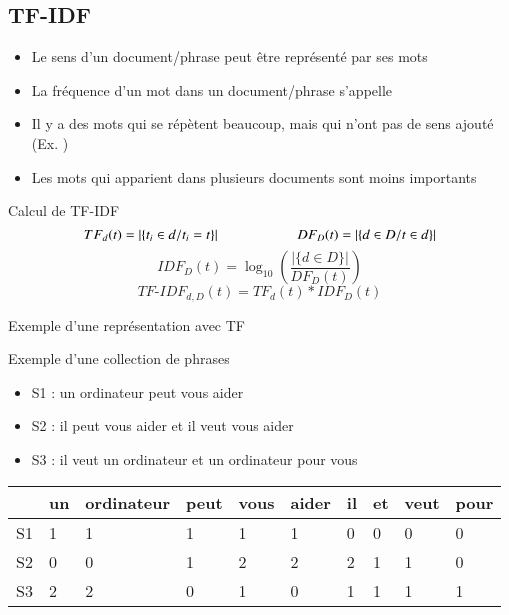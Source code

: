\documentclass{KodeBook}
\begin{document}
\subsection{TF-IDF}

\begin{itemize}
	\item Le sens d'un document/phrase peut être représenté par ses mots 
	\item La fréquence d'un mot dans un document/phrase s'appelle 
	\item Il y a des mots qui se répètent beaucoup, mais qui n'ont pas de sens ajouté (Ex. )
	\item Les mots qui apparient dans plusieurs documents sont moins importants
\end{itemize}

\begin{block}{Calcul de TF-IDF}
	\[
	TF_d(t) =  |\{t_i \in d / t_i = t\}|
	\hskip2cm 
	DF_D(t) = |\{d \in D / t \in d\}|
	\]
	\[IDF_D(t) = \log_{10} \left( \frac{|\{d \in D\}|}{DF_D(t)} \right)\]
	\[TF\text{-}IDF_{d, D}(t) = TF_d(t) * IDF_D(t)\]
\end{block}

 Exemple d'une représentation avec TF
 
 \begin{exampleblock}{Exemple d'une collection de phrases}
 	\begin{itemize}
 		\item S1 : un ordinateur peut vous aider
 		\item S2 : il peut vous aider et il veut vous aider
 		\item S3 : il veut un ordinateur et un ordinateur pour vous
 	\end{itemize}
 \end{exampleblock}
 
 \begin{center}
 	\begin{tabular}{llllllllll}
 		\hline\hline
 		& un & ordinateur & peut & vous & aider & il & et & veut & pour \\
 		\hline
 		S1 & 1 & 1 & 1 & 1 & 1 & 0 & 0 & 0 & 0\\
 		S2 & 0 & 0 & 1 & 2 & 2 & 2 & 1 & 1 & 0\\
 		S3 & 2 & 2 & 0 & 1 & 0 & 1 & 1 & 1 & 1\\
 		\hline\hline
 	\end{tabular}
 \end{center}
\end{document}
